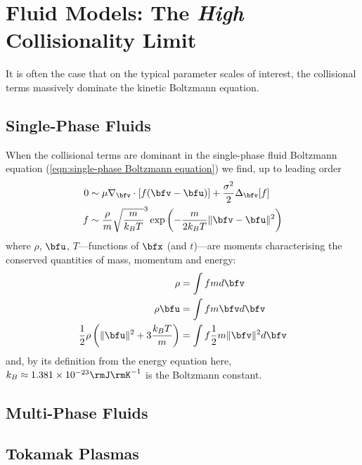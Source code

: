 \section{Fluid Models: The \emph{High} Collisionality Limit}
    It is often the case that on the typical parameter scales of interest, the collisional terms massively dominate the kinetic Boltzmann equation. 
    
    \subsection{Single-Phase Fluids}
        When the collisional terms are dominant in the single-phase fluid Boltzmann equation (\ref{eqn:single-phase Boltzmann equation}) we find, up to leading order
        \begin{align}
            0  &\sim  \mu\nabla_{\bfv}\cdot[f(\bfv - \bfu)] + \frac{\sigma^{2}}{2}\Delta_{\bfv}[f]  \\
            f  &\sim  \frac{\rho}{m}\sqrt{\frac{m}{k_{B}T}}^{3}\exp\left(- \frac{m}{2k_{B}T}\|\bfv - \bfu\|^{2}\right)
        \end{align}
        where $\rho$, $\bfu$, $T$---functions of $\bfx$ (and $t$)---are moments characterising the conserved quantities of mass, momentum and energy:
        \begin{align}
            \rho  &=  \int fmd\bfv  \\
            \rho\bfu  &=  \int fm\bfv d\bfv  \\
            \frac{1}{2}\rho\left(\|\bfu\|^{2} + 3\frac{k_{B}T}{m}\right)  &=  \int f\frac{1}{2}m\|\bfv\|^{2}d\bfv
        \end{align}
        and, by its definition from the energy equation here,  $k_{B}  \approx  1.381\times10^{- 23}\rmJ\rmK^{- 1}$ is the Boltzmann constant.
    
    \subsection{Multi-Phase Fluids}
    \subsection{Tokamak Plasmas}